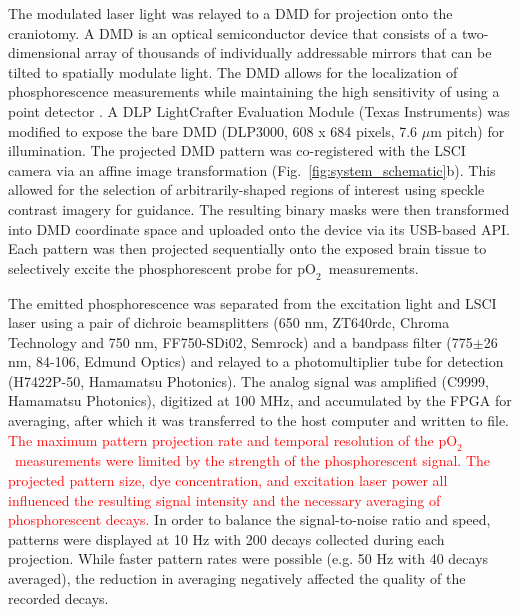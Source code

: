 \documentclass[12pt]{spieman}  %
\newcommand{\pO}{\ensuremath{\text{pO}_2}}
\begin{document}
\begin{spacing}{2}
The modulated laser light was relayed to a DMD for projection onto the craniotomy. A DMD is an optical semiconductor device that consists of a two-dimensional array of thousands of individually addressable mirrors that can be tilted to spatially modulate light. The DMD allows for the localization of phosphorescence measurements while maintaining the high sensitivity of using a point detector \cite{Ponticorvo:2010uv}. A DLP LightCrafter Evaluation Module (Texas Instruments) was modified to expose the bare DMD (DLP3000, 608 x 684 pixels, 7.6 $\mu$m pitch) for illumination. The projected DMD pattern was co-registered with the LSCI camera via an affine image transformation (Fig.~\ref{fig:system_schematic}b). This allowed for the selection of arbitrarily-shaped regions of interest using speckle contrast imagery for guidance. The resulting binary masks were then transformed into DMD coordinate space and uploaded onto the device via its USB-based API. Each pattern was then projected sequentially onto the exposed brain tissue to selectively excite the phosphorescent probe for \pO\ measurements.

The emitted phosphorescence was separated from the excitation light and LSCI laser using a pair of dichroic beamsplitters (650 nm, ZT640rdc, Chroma Technology and 750 nm, FF750-SDi02, Semrock) and a bandpass filter (775$\pm$26 nm, 84-106, Edmund Optics) and relayed to a photomultiplier tube for detection (H7422P-50, Hamamatsu Photonics). The analog signal was amplified (C9999, Hamamatsu Photonics), digitized at 100 MHz, and accumulated by the FPGA for averaging, after which it was transferred to the host computer and written to file. \textcolor{red}{The maximum pattern projection rate and temporal resolution of the \pO\ measurements were limited by the strength of the phosphorescent signal. The projected pattern size, dye concentration, and excitation laser power all influenced the resulting signal intensity and the necessary averaging of phosphorescent decays.} In order to balance the signal-to-noise ratio and speed, patterns were displayed at 10 Hz with 200 decays collected during each projection. While faster pattern rates were possible (e.g. 50 Hz with 40 decays averaged), the reduction in averaging negatively affected the quality of the recorded decays.



\end{spacing}
\end{document}
